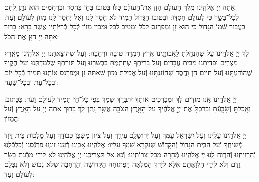 \documentclass[twoside, openany, parskip=half, 11pt]{book}
\begin{document}
\nextpage
{}
אַתָּה יְיָ אֱלֹהֵֽינוּ מֶֽלֶךְ הָעוֹלָם הַזָּן אֶת־הָעוֹלָם כֻּלּוֹ בְּֿטוּבוֹ בְּֿחֵן בְּֿחֶֽסֶד וּבְרַחֲמִים הוּא נֹתֵ֣ן לֶ֭חֶם לְֿכׇל־בָּשָׂ֑ר כִּ֖י לְֿעוֹלָ֣ם חַסְדּֽוֹ: וּבְטוּבוֹ הַגָּדוֹל תָּמִיד לֹא חָסַר לָֽנוּ וְֿאַל יֶחְסַר לָֽנוּ מָזוֹן לְֿעוֹלָם וָעֶד: בַּעֲבוּר שְֿׁמוֹ הַגָּדוֹל כִּי הוּא זָן וּמְפַרְנֵס לַכֹּל וּמֵטִיב לַכֹּל וּמֵכִין מָזוֹן לְֿכׇל־בְּֿֿרִיּוֹתָיו אֲשֶׁר בָּרָא: בָּרוּךְ אַתָּה יְיָ הַזָּן אֶת־הַכֹּל:



לְּֿךָ יְיָ אֱלֹהֵֽינוּ עַל שֶׁהִנְחַֽלְתָּ לַאֲבוֹתֵֽינוּ אֶֽרֶץ חֶמְדָה טוֹבָה וּרְחָבָה: וְֿעַל שֶׁהוֹצֵאתָֽנוּ יְיָ אֱלֹהֵֽינוּ מֵאֶֽרֶץ מִצְרַֽיִם וּפְדִיתָֽנוּ מִבֵּית עֲבָדִים וְֿעַל בְּֿרִיתְֿךָ שֶׁחָתַֽמְתָּ בִּבְשָׂרֵֽנוּ וְֿעַל תּוֹרָתְֿךָ שֶׁלִּמַּדְתָּֽנוּ וְֿעַל חֻקֶּֽיךָ שֶׁהוֹדַעְתָּֽנוּ וְֿעַל חַיִּים חֵן וָחֶֽסֶד שֶׁחוֹנַנְתָּֽנוּ וְֿעַל אֲכִילַת מָזוֹן שָׁאַתָּה זָן וּמְפַרְנֵס אוֹתָֽנוּ תָּמִיד בְּֿכׇל־יוֹם וּבְכׇל־עֵת וּבְכׇל־שָׁעָה:


\alhanisim

יְיָ אֱלֹהֵֽינוּ אָֽנוּ מוֹדִים לָךְ וּמְבָרְכִים אוֹתָךְ יִתְבָּרַךְ שִׁמְךָ בְּֿפִי כׇל־חַי תָּמִיד לְֿעוֹלָם וָעֶד: כַּכָּתוּב: וְאָֽכַלְתָּ֖ וְֿשָׂבָ֑עְֿתָּ וּבֵֽרַכְתָּ֙ אֶת־יְיָ֣ אֱלֹהֶ֔יךָ עַל־הָאָ֥רֶץ הַטֹּבָ֖ה אֲשֶׁ֥ר נָֽתַן־לָֽךְ׃ בָּרוּךְ אַתָּה יְיָ עַל הָאָֽרֶץ וְֿעַל הַמָּזוֹן:



יְיָ אֱלֹהֵֽינוּ עָלֵֽינוּ וְֿעַל יִשְׂרָאֵל עַמֶּךָ וְֿעַל יְֿרוּשָׁלַ‍ִם עִירֶֽךָ וְֿעַל צִיּוֹן מִשְׁכַּן כְּֿבוֹדֶֽךָ וְֿעַל מַלְכוּת בֵּית דָּוִד מְֿשִׁיחֶֽךָ וְֿעַל הַבַּֽיִת הַגָּדוֹל וְֿהַקָּדוֹשׁ שֶׁנִּקְרָא שִׁמְךָ עָלָיו: אֱלֹהֵֽינוּ אָבִֽינוּ רְֿעֵֽנוּ זוּנֵֽנוּ פַרְנְֿסֵֽנוּ וְֿכַלְכְּֿלֵֽנוּ וְֿהַרְוִיחֵֽנוּ וְֿהַרְוַח לָֽנוּ יְיָ אֱלֹהֵֽינוּ מְֿהֵרָה מִכׇּל־צָרוֹתֵֽינוּ: וְֿנָא אַל תַּצְרִיכֵֽנוּ יְיָ אֱלֹהֵֽינוּ לֹא לִידֵי מַתְּֿנַת בָּשָׂר וָדָם וְֿלֹא לִידֵי הַלְוָאָתָם אֶלָּא לְֿיָדְֿךָ הַמְּֿלֵאָה הַפְּֿתוּחָה הַקְּֿדוֹשָׁה וְֿהָרְֿחָבָה שֶׁלֹּא נֵבוֹשׁ וְֿלֹא נִכָּלֵם לְֿעוֹלָם וָעֶד:

\enlargethispage{\baselineskip}
\end{document}
